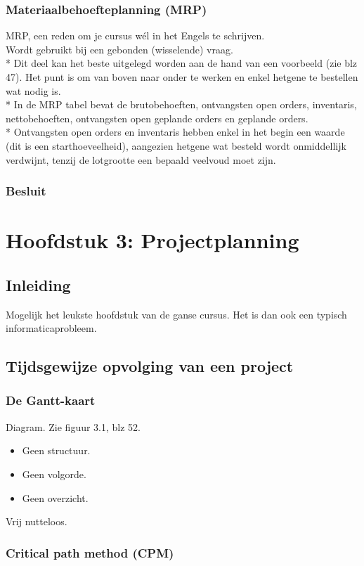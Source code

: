 \documentclass[12pt]{article}
\begin{document}
\subsubsection{Materiaalbehoefteplanning (MRP)}
MRP, een reden om je cursus w\'el in het Engels te schrijven.\\
Wordt gebruikt bij een gebonden (wisselende) vraag.\\*
Dit deel kan het beste uitgelegd worden aan de hand van een voorbeeld (zie blz 47). Het punt is om van boven naar onder te werken en enkel hetgene te bestellen wat nodig is.\\*
In de MRP tabel bevat de brutobehoeften, ontvangsten open orders, inventaris, nettobehoeften, ontvangsten open geplande orders en geplande orders.\\*
Ontvangsten open orders en inventaris hebben enkel in het begin een waarde (dit is een starthoeveelheid), aangezien hetgene wat besteld wordt onmiddellijk verdwijnt, tenzij de lotgrootte een bepaald veelvoud moet zijn.
\subsubsection{Besluit}
\clearpage
\section{Hoofdstuk 3: Projectplanning}
\subsection{Inleiding}
Mogelijk het leukste hoofdstuk van de ganse cursus. Het is dan ook een typisch informaticaprobleem.
\subsection{Tijdsgewijze opvolging van een project}
\subsubsection{De Gantt-kaart}
Diagram. Zie figuur 3.1, blz 52.
\begin{itemize}
\item Geen structuur.
\item Geen volgorde.
\item Geen overzicht.
\end{itemize}
Vrij nutteloos.
\subsubsection{Critical path method (CPM)}
\end{document}
